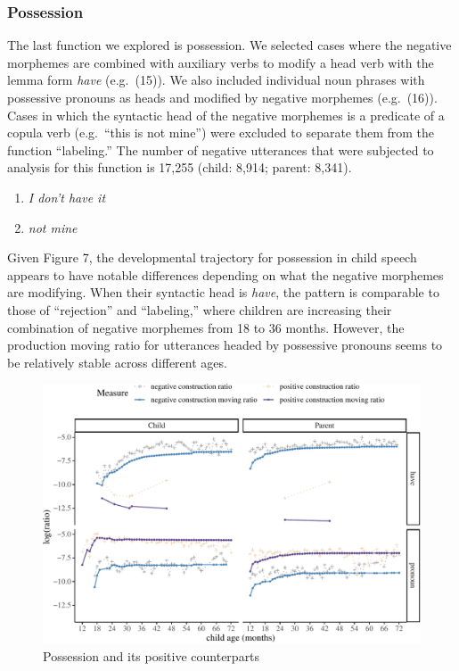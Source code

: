 \documentclass[
  english,
  man,floatsintext]{apa6}
\providecommand{\tightlist}{%
  \setlength{\itemsep}{0pt}\setlength{\parskip}{0pt}}
\begin{document}
\clearpage

\hypertarget{possession}{%
\subsubsection{Possession}\label{possession}}

The last function we explored is possession. We selected cases where the negative morphemes are combined with auxiliary verbs to modify a head verb with the lemma form \emph{have} (e.g.~(15)). We also included individual noun phrases with possessive pronouns as heads and modified by negative morphemes (e.g.~(16)). Cases in which the syntactic head of the negative morphemes is a predicate of a copula verb (e.g.~``this is not mine'') were excluded to separate them from the function ``labeling.'' The number of negative utterances that were subjected to analysis for this function is 17,255 (child: 8,914; parent: 8,341).

\begin{enumerate}
\def\labelenumi{(\arabic{enumi})}
\setcounter{enumi}{14}
\tightlist
\item
  \emph{I don't have it}
\item
  \emph{not mine}
\end{enumerate}

Given Figure 7, the developmental trajectory for possession in child speech appears to have notable differences depending on what the negative morphemes are modifying. When their syntactic head is \emph{have}, the pattern is comparable to those of ``rejection'' and ``labeling,'' where children are increasing their combination of negative morphemes from 18 to 36 months. However, the production moving ratio for utterances headed by possessive pronouns seems to be relatively stable across different ages.

\begin{figure}[H]

{\centering \includegraphics{neg_construction_article_files/figure-latex/possession-1} 

}

\caption{Possession and its positive counterparts}\label{fig:possession}
\end{figure}
\end{document}
